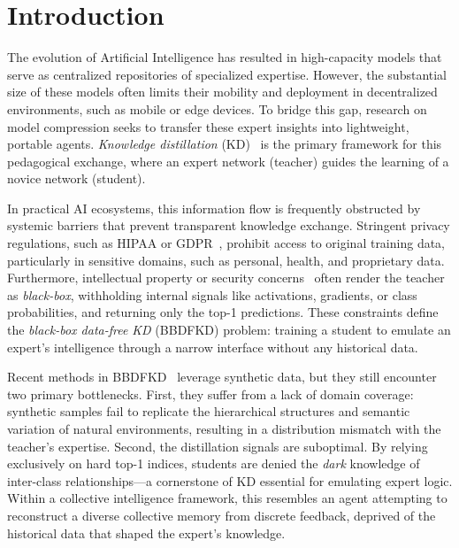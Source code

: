 \section{Introduction} \label{sec:01-introduction}

\begin{foldable} %
  The evolution of Artificial Intelligence has resulted in high-capacity models that serve as centralized repositories of specialized expertise.
  However, the substantial size of these models often limits their mobility and deployment in decentralized environments, such as mobile or edge devices.
  To bridge this gap, research on model compression seeks to transfer these expert insights into lightweight, portable agents.
  \textit{Knowledge distillation} (KD)~\cite{hinton2015distilling} is the primary framework for this pedagogical exchange, where an expert network (teacher) guides the learning of a novice network (student).
\end{foldable}

\begin{foldable} %
  In practical AI ecosystems, this information flow is frequently obstructed by systemic barriers that prevent transparent knowledge exchange.
  Stringent privacy regulations, such as HIPAA or GDPR~\cite{us1996hipaa, eu2016gdpr}, prohibit access to original training data, particularly in sensitive domains, such as personal, health, and proprietary data.
  Furthermore, intellectual property or security concerns~\cite{us2016dsta} often render the teacher as \textit{black-box}, withholding internal signals like activations, gradients, or class probabilities, and returning only the top-1 predictions.
  These constraints define the \textit{black-box data-free KD} (BBDFKD) problem: training a student to emulate an expert's intelligence through a narrow interface without any historical data.
\end{foldable}

\begin{foldable} %
  Recent methods in BBDFKD~\cite{wang2021zero,zhang2022ideal,yuan2024data} leverage synthetic data, but they still encounter two primary bottlenecks.
  First, they suffer from a lack of domain coverage: synthetic samples fail to replicate the hierarchical structures and semantic variation of natural environments, resulting in a distribution mismatch with the teacher's expertise.
  Second, the distillation signals are suboptimal.
  By relying exclusively on hard top-1 indices, students are denied the \textit{dark} knowledge of inter-class relationships---a cornerstone of KD essential for emulating expert logic.
  Within a collective intelligence framework, this resembles an agent attempting to reconstruct a diverse collective memory from discrete feedback, deprived of the historical data that shaped the expert's knowledge.
\end{foldable}

